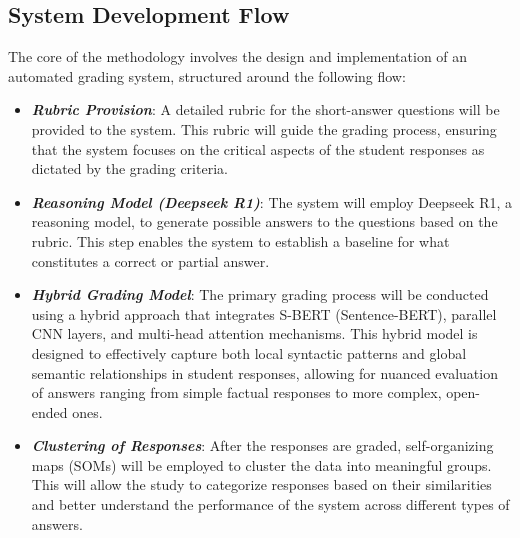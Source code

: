 \documentclass[a4paper,10pt]{article}
\begin{document}
\subsection{System Development Flow}
The core of the methodology involves the design and implementation of an automated grading system, structured around the following flow:
 \begin{itemize}
     \item \textit{\textbf{Rubric Provision}}: A detailed rubric for the short-answer questions will be provided to the system. This rubric will guide the grading process, ensuring that the system focuses on the critical aspects of the student responses as dictated by the grading criteria.
     \item \textit{\textbf{Reasoning Model (Deepseek R1)}}: The system will employ Deepseek R1, a reasoning model, to generate possible answers to the questions based on the rubric. This step enables the system to establish a baseline for what constitutes a correct or partial answer.
     \item \textit{\textbf{Hybrid Grading Model}}: The primary grading process will be conducted using a hybrid approach that integrates S-BERT (Sentence-BERT), parallel CNN layers, and multi-head attention mechanisms. This hybrid model is designed to effectively capture both local syntactic patterns and global semantic relationships in student responses, allowing for nuanced evaluation of answers ranging from simple factual responses to more complex, open-ended ones.
     \item \textit{\textbf{Clustering of Responses}}:  After the responses are graded, self-organizing maps (SOMs) will be employed to cluster the data into meaningful groups. This will allow the study to categorize responses based on their similarities and better understand the performance of the system across different types of answers.
 \end{itemize}
\end{document}
